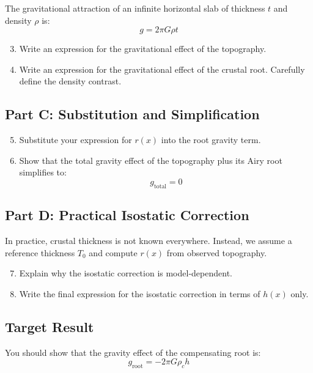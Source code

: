 \documentclass[11pt,a4paper]{article}
\begin{document}
The gravitational attraction of an infinite horizontal slab of thickness $t$ and density $\rho$ is:
\[
g = 2\pi G \rho t
\]

\begin{enumerate}
    \setcounter{enumi}{2}
    \item Write an expression for the gravitational effect of the topography.

    \item Write an expression for the gravitational effect of the crustal root. Carefully define the density contrast.
\end{enumerate}

\subsection*{Part C: Substitution and Simplification}

\begin{enumerate}
    \setcounter{enumi}{4}
    \item Substitute your expression for $r(x)$ into the root gravity term.

    \item Show that the total gravity effect of the topography plus its Airy root simplifies to:
    \[
    g_{\text{total}} = 0
    \]
\end{enumerate}

\subsection*{Part D: Practical Isostatic Correction}

In practice, crustal thickness is not known everywhere. Instead, we assume a reference thickness $T_0$ and compute $r(x)$ from observed topography.

\begin{enumerate}
    \setcounter{enumi}{6}
    \item Explain why the isostatic correction is model-dependent.

    \item Write the final expression for the isostatic correction in terms of $h(x)$ only.
\end{enumerate}

\subsection*{Target Result}

You should show that the gravity effect of the compensating root is:
\[
g_{\text{root}} = -2\pi G \rho_c h
\]
\end{document}
